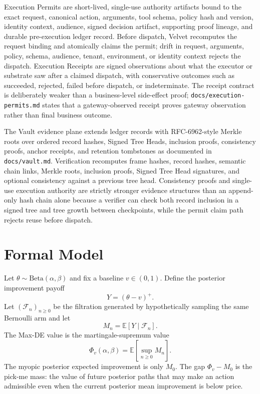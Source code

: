 \documentclass[11pt]{article}
\begin{document}
Execution Permits are short-lived, single-use authority artifacts bound to the exact request, canonical action, arguments, tool schema, policy hash and version, identity context, audience, signed decision artifact, supporting proof lineage, and durable pre-execution ledger record. Before dispatch, Velvet recomputes the request binding and atomically claims the permit; drift in request, arguments, policy, schema, audience, tenant, environment, or identity context rejects the dispatch. Execution Receipts are signed observations about what the executor or substrate saw after a claimed dispatch, with conservative outcomes such as succeeded, rejected, failed before dispatch, or indeterminate. The receipt contract is deliberately weaker than a business-level side-effect proof; \texttt{docs/execution-permits.md} states that a gateway-observed receipt proves gateway observation rather than final business outcome.

The Vault evidence plane extends ledger records with RFC-6962-style Merkle roots over ordered record hashes, Signed Tree Heads, inclusion proofs, consistency proofs, anchor receipts, and retention tombstones as documented in \texttt{docs/vault.md}. Verification recomputes frame hashes, record hashes, semantic chain links, Merkle roots, inclusion proofs, Signed Tree Head signatures, and optional consistency against a previous tree head. Consistency proofs and single-use execution authority are strictly stronger evidence structures than an append-only hash chain alone because a verifier can check both record inclusion in a signed tree and tree growth between checkpoints, while the permit claim path rejects reuse before dispatch.

\section{Formal Model}

Let $\theta \sim \mathrm{Beta}(\alpha,\beta)$ and fix a baseline $v \in (0,1)$. Define the posterior improvement payoff
\[
    Y=(\theta-v)^+.
\]
Let $(\mathcal{F}_n)_{n\geq 0}$ be the filtration generated by hypothetically sampling the same Bernoulli arm and let
\[
    M_n=\mathbb{E}[Y\mid \mathcal{F}_n].
\]
The Max-DE value is the martingale-supremum value
\[
    \Phi_v(\alpha,\beta)=\mathbb{E}\left[\sup_{n\geq 0} M_n\right].
\]
The myopic posterior expected improvement is only $M_0$. The gap $\Phi_v-M_0$ is the pick-me mass: the value of future posterior paths that may make an action admissible even when the current posterior mean improvement is below price.
\end{document}
